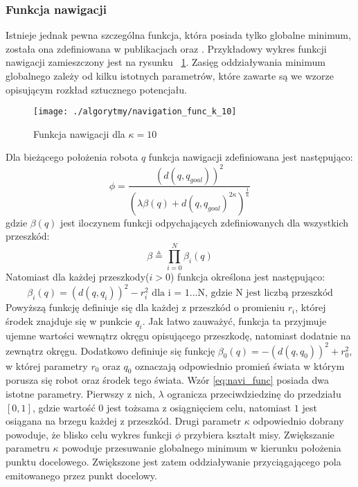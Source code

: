 \subsubsection{Funkcja nawigacji \label{subsubsec:navigation_func}}
	Istnieje jednak pewna szczególna funkcja, która posiada tylko globalne minimum, została ona zdefiniowana w publikacjach \cite{navi_func1} oraz \cite{navi_func2}.
	Przykładowy wykres funkcji nawigacji zamieszczony jest na rysunku ~\ref{fig:func_navi}. Zasięg oddziaływania minimum globalnego zależy od kilku istotnych parametrów, które zawarte są 
	we wzorze opisującym rozkład sztucznego potencjału.
	\begin{figure}[!h]
	\centering
	\texttt{[image: ./algorytmy/navigation\_func\_k\_10]}
	\caption{Funkcja nawigacji dla $\kappa=10$}
	\label{fig:func_navi}
	\end{figure}
	Dla bieżącego położenia robota $q$ funkcja nawigacji zdefiniowana jest następująco:
	\begin{equation}
	\label{eq:navi_func}
	\phi = \frac{(d(q,q_{goal}))^2}{ (\lambda \beta(q) + d(q,q_{goal})^{2\kappa} )^{\frac{1}{\kappa}}}
	\end{equation}
	gdzie $\beta(q)$ jest iloczynem funkcji odpychających zdefiniowanych dla wszystkich przeszkód:
	\begin{equation}
	\beta  \stackrel{ \vartriangle }{ = } \prod_{i=0}^{N}{ \beta_i(q)}    
	\end{equation}
	Natomiast dla każdej przeszkody($i>0$) funkcja określona jest następująco:
	\begin{equation}
	\beta_{i}(q)=(d(q,q_i))^2 - r_i^{2} \text{ dla i = 1...N, gdzie N jest liczbą przeszkód}
	\end{equation}
	Powyższą funkcję definiuje się dla każdej z przeszkód o promieniu $r_i$, której środek znajduje się w punkcie $q_i$.
	Jak łatwo zauważyć, funkcja ta przyjmuje ujemne wartości wewnątrz okręgu opisującego przeszkodę, natomiast dodatnie na zewnątrz okręgu.
	Dodatkowo definiuje się funkcję $\beta_{0}(q)= -(d(q,q_0))^{2} + r_0^{2}$, w której parametry $r_0$ oraz $q_0$ oznaczają odpowiednio promień świata w którym porusza się robot
	oraz środek tego świata.
	Wzór \ref{eq:navi_func} posiada dwa istotne parametry. Pierwszy z nich, $\lambda$ ogranicza przeciwdziedzinę do przedziału $[0,1]$, gdzie wartość $0$ jest tożsama z osiągnięciem celu, natomiast
	$1$ jest osiągana na brzegu każdej z przeszkód. Drugi parametr $\kappa$ odpowiednio dobrany powoduje, że blisko celu wykres funkcji $\phi$ przybiera kształt misy.
	Zwiększanie parametru $\kappa$ powoduje przesuwanie globalnego minimum w kierunku położenia punktu docelowego. Zwiększone jest zatem oddziaływanie przyciągającego pola emitowanego przez 
	punkt docelowy.

